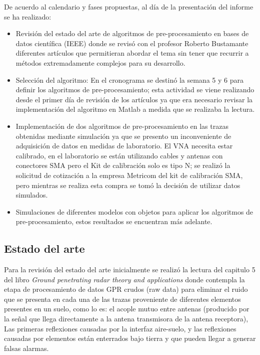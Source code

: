 De acuerdo al calendario y fases propuestas, al día de la presentación del informe se ha realizado:

\begin{itemize}
\item Revisión del estado del arte de algoritmos de pre-procesamiento en bases de datos científica (IEEE) donde se revisó con el profesor Roberto Bustamante diferentes artículos que permitieran abordar el tema sin tener que recurrir a métodos extremadamente complejos para su desarrollo. 

\item Selección del algoritmo: En el cronograma se destinó la semana 5 y 6 para definir los algoritmos de pre-procesamiento; esta actividad se viene realizando desde el primer día de revisión de los artículos ya que era necesario revisar la implementación del algoritmo en Matlab a medida que se realizaba la lectura.

\item  Implementación de dos algoritmos de pre-procesamiento en las trazas obtenidas mediante simulación ya que se presento un inconveniente de adquisición de datos en medidas de laboratorio.  El VNA necesita estar calibrado,  en el laboratorio se están utilizando cables y antenas con conectores SMA pero el Kit de calibración solo es tipo N; se realizó la solicitud de cotización a la empresa Metricom del kit de calibración SMA, pero mientras se realiza esta compra se tomó la  decisión de utilizar datos simulados.

\item Simulaciones de diferentes modelos con objetos para aplicar los algoritmos de pre-procesamiento, estos resultados se encuentran más adelante. 

\end{itemize}




\subsection{Estado del arte}
Para la revisión del estado del arte inicialmente se realizó la lectura del capitulo 5 del libro \textit{Ground penetrating radar theory and applications} \cite{gpr_HarryM} donde contempla la etapa de procesamiento de datos GPR crudos (raw data) para eliminar el ruido que se presenta en cada una de las trazas proveniente de diferentes elementos presentes en un suelo, como lo es: el acople mutuo entre antenas (producido por la señal que llega directamente a la antena transmisora de la antena receptora), Las primeras reflexiones causadas por la interfaz aire-suelo, y las reflexiones causadas por elementos están enterrados bajo tierra y que pueden llegar a generar falsas alarmas. 

